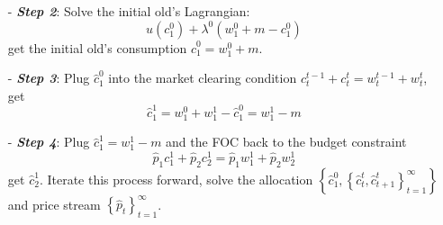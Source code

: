 \documentclass[10pt,landscape,a4paper]{article}
\begin{document}
\begin{multicols*}{3}
\begin{itemize}
    \item[-] \textit{\textbf{Step 2}}: Solve the initial old's Lagrangian:
    $$u(c^0_1)+\lambda^0\left(w_1^0+m-c_1^0\right)$$ get the initial old's consumption $\hat{c}^0_1=w_1^0+m$.
    
    \item[-] \textbf{\textit{Step 3}}: Plug $\hat{c}_1^0$ into the market clearing condition $c_t^{t-1} +c_t^t=w_t^{t-1}+w_t^t$, get
    $$\hat{c}_1^1=w_1^0+w_1^1-\hat{c}_1^0=w_1^1-m$$
    
    
    \item[-] \textit{\textbf{Step 4}}: Plug $\hat{c}_1^1=w_1^1-m$ and the FOC back to the budget constraint
    $$\hat{p}_1 c^1_1+\hat{p}_2 c^1_2 = \hat{p}_1 w^1_1+\hat{p}_2 w^1_2$$
    get $\hat{c}^1_2$. Iterate this process forward, solve the allocation $\left\{\hat{c}^0_1,\left\{\hat{c}^t_t,\hat{c}^t_{t+1}\right\}^{\infty}_{t=1}\right\}$ and price stream $\left\{\hat{p}_t\right\}^{\infty}_{t=1}$.
\end{itemize}


\end{multicols*}
\end{document}
